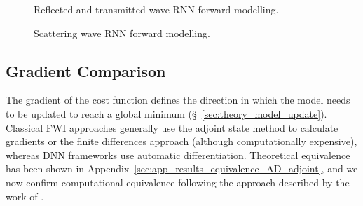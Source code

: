 \begin{figure}[!ht]
	\centering
	\caption[Reflected and transmitted wave RNN forward modelling.]{Reflected and transmitted wave RNN forward modelling.}        
	\label{fig:rnn_2d_reflection}
\end{figure}

\begin{figure}[!ht]
\centering
{}
\caption[Scattering wave RNN forward modelling.]{Scattering wave RNN forward modelling.}    
\label{fig:rnn_2d_scattering}
\end{figure}

\clearpage
\subsection{Gradient Comparison}
The gradient of the cost function defines the direction in which the model needs to be updated to reach a global minimum (§~\ref{sec:theory_model_update}). Classical FWI approaches generally use the adjoint state method to calculate gradients or the finite differences approach (although computationally expensive), whereas DNN frameworks use automatic differentiation. Theoretical equivalence has been shown in Appendix~\ref{sec:app_results_equivalence_AD_adjoint}, and we now confirm computational equivalence following the approach described by the work of \cite{Richardson2018}.

